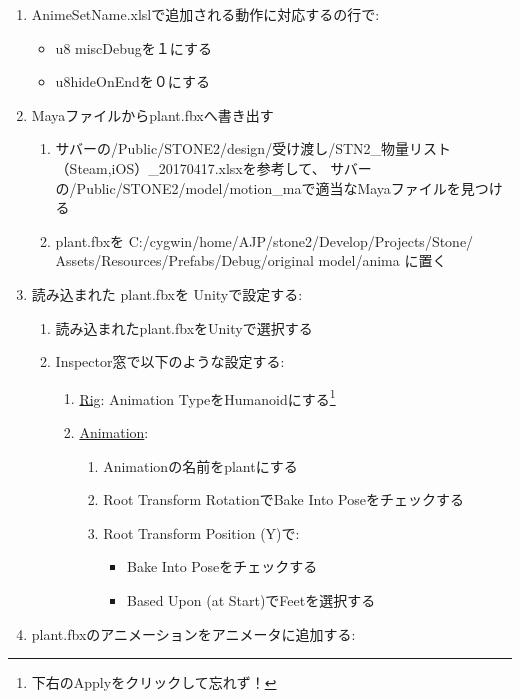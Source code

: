 \documentclass[a4paper]{report}
\newcommand{\tname}{{\ttfamily AnimeSetName.xlsl}}
\newcommand{\fbxname}{{\ttfamily plant.fbx}}
\begin{document}
\begin{enumerate}
	\item \tname で追加される動作に対応するの行で:\begin{itemize}
			\item u8 miscDebugを１にする
			\item u8hideOnEndを０にする
		\end{itemize}
	\item Mayaファイルから{\ttfamily plant.fbx}へ書き出す\begin{enumerate}
			\item サバーの{\ttfamily /Public/STONE2/design/受け渡し/STN2\_物量リスト（Steam,iOS）\_20170417.xlsx}を参考して、
				サバーの{\ttfamily /Public/STONE2/model/motion\_ma}で適当なMayaファイルを見つける
			\item \fbxname を {\ttfamily 
				C:/cygwin/home/AJP/stone2/Develop/Projects/Stone/}\\{\ttfamily Assets/Resources/Prefabs/Debug/original model/anima
				}に置く
		\end{enumerate}
	\item 読み込まれた \fbxname を Unityで設定する:
	\begin{enumerate}
		\item 読み込まれた\fbxname をUnityで選択する
		\item Inspector窓で以下のような設定する:
			\begin{enumerate}
				\item \underline{Rig}: Animation TypeをHumanoidにする\footnote{下右のApplyをクリックして忘れず！}
				\item \underline{Animation}:
					\begin{enumerate}
						\item Animationの名前をplantにする
						\item Root Transform RotationでBake Into Poseをチェックする
						\item Root Transform Position (Y)で:\begin{itemize}
								\item Bake Into Poseをチェックする
								\item Based Upon (at Start)でFeetを選択する
							\end{itemize}
					\end{enumerate}
			\end{enumerate}
	\end{enumerate}
\item \fbxname のアニメーションをアニメータに追加する:\begin{enumerate}

\end{enumerate}
\end{enumerate}
\end{document}
